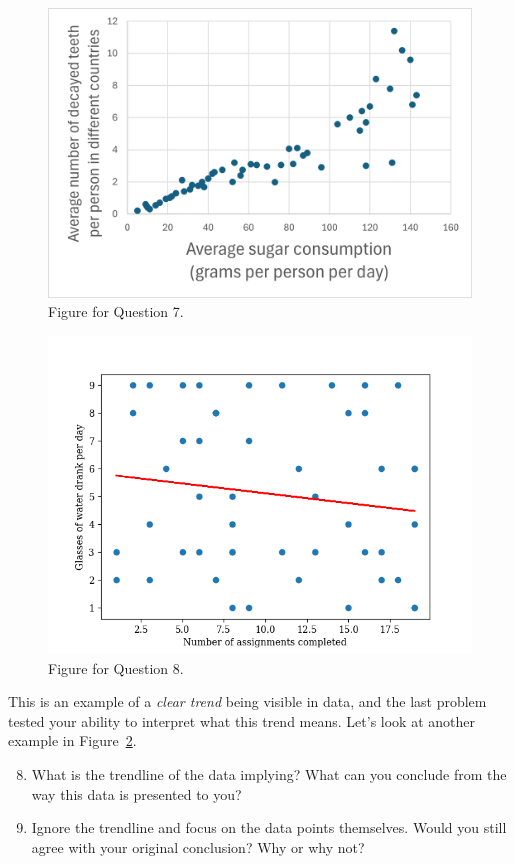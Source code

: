 \documentclass[11pt]{article}%
\begin{document}
\begin{figure}
    \centering
    \includegraphics[width=0.5\linewidth]{Images/example_scatter_trend.png}
    \caption{ Figure for Question 7.}
    \label{fig:example_scatter_trend}
\end{figure}

\begin{figure}
    \centering
    \includegraphics[width=0.75\linewidth]{Images/scatter_bad_trend.png}
    \caption{Figure for Question 8.}
    \label{fig:scatter_bad_trend}
\end{figure}

This is an example of a \textit{clear trend} being visible in data, and the last problem tested your ability to interpret what this trend means. Let's look at another example in Figure~\ref{fig:scatter_bad_trend}. 

\begin{enumerate}
    \setcounter{enumi}{7}
    \item What is the trendline of the data implying? What can you conclude from the way this data is presented to you?
    \item Ignore the trendline and focus on the data points themselves. Would you still agree with your original conclusion? Why or why not?
\end{enumerate}

\newpage
\end{document}
